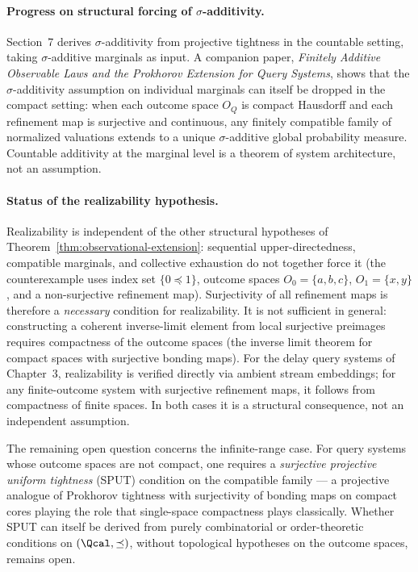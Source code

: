 \paragraph{Progress on structural forcing of $\sigma$-additivity.}
Section~7 derives $\sigma$-additivity from projective tightness in
the countable setting, taking $\sigma$-additive marginals as input.
A companion paper, \emph{Finitely Additive Observable Laws and the
Prokhorov Extension for Query Systems}, shows that the $\sigma$-additivity
assumption on individual marginals can itself be dropped in the compact
setting: when each outcome space $O_Q$ is compact Hausdorff and each
refinement map is surjective and continuous, any finitely compatible
family of normalized valuations extends to a unique $\sigma$-additive
global probability measure.  Countable additivity at the marginal level
is a theorem of system architecture, not an assumption.

\paragraph{Status of the realizability hypothesis.}
Realizability is independent of the other structural hypotheses of
Theorem~\ref{thm:observational-extension}: sequential upper-directedness,
compatible marginals, and collective exhaustion do not together force it
(the counterexample uses index set $\{0 \preceq 1\}$, outcome spaces $O_0 = \{a,b,c\}$,
$O_1 = \{x,y\}$, and a non-surjective refinement map).
Surjectivity of all refinement maps is therefore a \emph{necessary} condition for
realizability.  It is not sufficient in general: constructing a coherent inverse-limit
element from local surjective preimages requires compactness of the outcome spaces
(the inverse limit theorem for compact spaces with surjective bonding maps).
For the delay query systems of Chapter~3, realizability is verified directly via
ambient stream embeddings; for any finite-outcome system with surjective refinement
maps, it follows from compactness of finite spaces.  In both cases it is a structural
consequence, not an independent assumption.

The remaining open question concerns the infinite-range case.
For query systems whose outcome spaces are not compact, one requires
a \emph{surjective projective uniform tightness} (SPUT) condition on
the compatible family --- a projective analogue of Prokhorov tightness
with surjectivity of bonding maps on compact cores playing the role
that single-space compactness plays classically.  Whether SPUT can
itself be derived from purely combinatorial or order-theoretic
conditions on $(\Qcal, \preceq)$, without topological hypotheses on
the outcome spaces, remains open.

